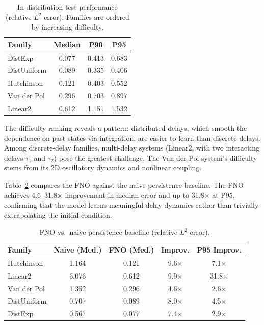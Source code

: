\begin{table}[h]
\centering
\caption{In-distribution test performance (relative $L^2$ error).
Families are ordered by increasing difficulty.}
\label{tab:id-results}
\begin{tabular}{lccc}
\toprule
Family & Median & P90 & P95 \\
\midrule
DistExp        & 0.077 & 0.413 & 0.683 \\
DistUniform    & 0.089 & 0.335 & 0.406 \\
Hutchinson     & 0.121 & 0.403 & 0.552 \\
Van der Pol    & 0.296 & 0.703 & 0.897 \\
Linear2        & 0.612 & 1.151 & 1.532 \\
\bottomrule
\end{tabular}
\end{table}

The difficulty ranking reveals a pattern: distributed delays, which smooth the
dependence on past states via integration, are easier to learn than discrete delays.
Among discrete-delay families, multi-delay systems (Linear2, with two interacting
delays $\tau_1$ and $\tau_2$) pose the greatest challenge.  The Van der Pol system's
difficulty stems from its 2D oscillatory dynamics and nonlinear coupling.

Table~\ref{tab:baseline-comparison} compares the FNO against the naive persistence
baseline.  The FNO achieves 4.6--31.8$\times$ improvement in median error and up to
31.8$\times$ at P95, confirming that the model learns meaningful delay dynamics
rather than trivially extrapolating the initial condition.

\begin{table}[h]
\centering
\caption{FNO vs.\ naive persistence baseline (relative $L^2$ error).}
\label{tab:baseline-comparison}
\begin{tabular}{lcccc}
\toprule
Family & Naive (Med.) & FNO (Med.) & Improv. & P95 Improv. \\
\midrule
Hutchinson  & 1.164 & 0.121 & 9.6$\times$  & 7.1$\times$ \\
Linear2     & 6.076 & 0.612 & 9.9$\times$  & 31.8$\times$ \\
Van der Pol & 1.352 & 0.296 & 4.6$\times$  & 2.6$\times$ \\
DistUniform & 0.707 & 0.089 & 8.0$\times$  & 4.5$\times$ \\
DistExp     & 0.567 & 0.077 & 7.4$\times$  & 2.9$\times$ \\
\bottomrule
\end{tabular}
\end{table}

